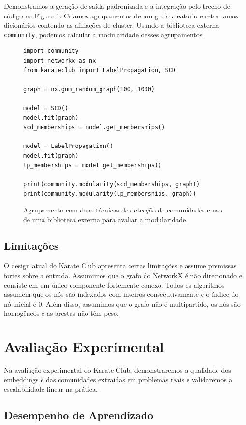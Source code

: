 \documentclass[sigconf]{acmart}
\begin{document}
Demonstramos a geração de saída padronizada e a integração pelo trecho de código na Figura \ref{fig:code4}. Criamos agrupamentos de um grafo aleatório e retornamos dicionários contendo as afiliações de cluster. Usando a biblioteca externa \texttt{community}, podemos calcular a modularidade desses agrupamentos.

\begin{figure}[h]
\begin{lstlisting}
import community
import networkx as nx
from karateclub import LabelPropagation, SCD

graph = nx.gnm_random_graph(100, 1000)

model = SCD()
model.fit(graph)
scd_memberships = model.get_memberships()

model = LabelPropagation()
model.fit(graph)
lp_memberships = model.get_memberships()

print(community.modularity(scd_memberships, graph))
print(community.modularity(lp_memberships, graph))
\end{lstlisting}
\caption{Agrupamento com duas técnicas de detecção de comunidades e uso de uma biblioteca externa para avaliar a modularidade.}
\label{fig:code4}
\end{figure}

\subsection{Limitações}

O design atual do Karate Club apresenta certas limitações e assume premissas fortes sobre a entrada. Assumimos que o grafo do NetworkX é não direcionado e consiste em um único componente fortemente conexo. Todos os algoritmos assumem que os nós são indexados com inteiros consecutivamente e o índice do nó inicial é 0. Além disso, assumimos que o grafo não é multipartido, os nós são homogêneos e as arestas não têm peso.

\section{Avaliação Experimental}

Na avaliação experimental do Karate Club, demonstraremos a qualidade dos embeddings e das comunidades extraídas em problemas reais e validaremos a escalabilidade linear na prática.

\subsection{Desempenho de Aprendizado}
\end{document}
